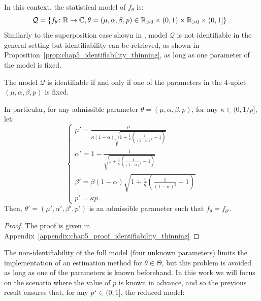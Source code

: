     In this context, the statistical model of $f_\theta$ is:
    \[\mathcal{Q} = 
      \left\{
        f_\theta \colon {\mathbb R} \to {\mathbb C}, 
        \theta = (\mu, \alpha, \beta, p) \in {\mathbb R}_{>0}\times (0,1) \times {\mathbb R}_{>0}\times(0,1]
      \right\}\,.
    \]
    Similarly to the superposition case shown in \textcite[Proposition 3.2]{Bonnet2024}, 
    model $\mathcal{Q}$ is not identifiable in the general setting but identifiability can be retrieved, as shown in Proposition~\ref{prop:chap5_identifiability_thinning}, as long as one parameter of the model is fixed.

    \begin{proposition}\label{prop:chap5_identifiability_thinning}
        The model $\mathcal{Q}$ is identifiable if and only if one of the parameters in the 4-uplet $(\mu, \alpha, \beta, p)$ is fixed.

        In particular, for any admissible parameter $\theta = (\mu, \alpha, \beta, p)$,
        for any $\kappa\in(0, 1/p]$, let:
        \begin{equation}\label{eq:chap5_nonidentifiable_parameters}
        \begin{cases}
            \mu' = \frac{\mu}{\kappa(1-\alpha)\sqrt{1 + \frac{1}{\kappa}\left(\frac{1}{(1-\alpha)^2} - 1\right)}}\\
            \alpha' = 1 - \frac{1}{\sqrt{1 + \frac{1}{\kappa}\left(\frac{1}{(1-\alpha)^2} - 1\right)}}\\
            \beta' = \beta (1-\alpha) \sqrt{1 + \frac{1}{\kappa}\left(\frac{1}{(1-\alpha)^2} - 1\right)}\\
            p' = \kappa p\,.
          \end{cases}
        \end{equation}
          Then, $\theta' = (\mu', \alpha', \beta', p')$ is an admissible parameter such that $f_{\theta} = f_{\theta'}$.
    \end{proposition}

    \begin{proof}
        The proof is given in Appendix~\ref{appendix:chap5_proof_identifiability_thinning}
    \end{proof}

    The non-identifiability of the full model (four unknown parameters) limits the implementation of an estimation method for $\theta\in\Theta$, but this problem is avoided as long as one of the parameters is known beforehand. 
    In this work we will focus on the scenario where the value of $p$ is known in advance, 
    and so the previous result ensures that, for any $p^\star\in(0,1]$, the reduced model:
    
